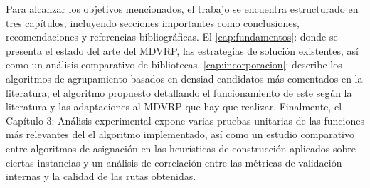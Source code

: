 Para alcanzar los objetivos mencionados, el trabajo se encuentra estructurado en tres capítulos, incluyendo secciones importantes como conclusiones, recomendaciones y referencias bibliográficas. El \autoref{cap:fundamentos}:  donde se presenta el estado del arte del MDVRP, las estrategias de solución existentes, así como un análisis comparativo de bibliotecas. \autoref{cap:incorporacion}:  describe los algoritmos de agrupamiento basados en densiad candidatos más comentados en la literatura, el algoritmo propuesto detallando el funcionamiento de este según la literatura y las adaptaciones al MDVRP que hay que realizar. Finalmente, el Capítulo 3: Análisis experimental expone varias pruebas unitarias de las funciones más relevantes del el algoritmo implementado, así como un estudio comparativo entre algoritmos de asignación en las heurísticas de construcción aplicados sobre ciertas instancias y un análisis de correlación entre las métricas de validación internas y la calidad de las rutas obtenidas.